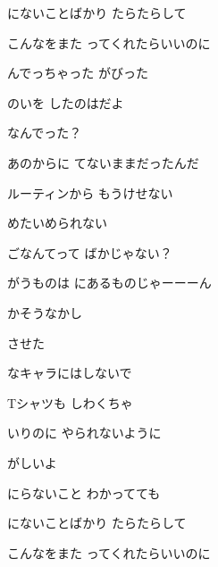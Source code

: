 \documentclass[a4paper,tate,twocolumn,12pt]{ltjtarticle}
\begin{document}
\begin{flushleft}
\begin{minipage}{\linewidth}
にないことばかり たらたらして

こんなをまた ってくれたらいいのに
\end{minipage}

\vspace{2em}

\noindent\begin{minipage}{\linewidth}
んでっちゃった がびった

のいを したのはだよ

なんでった？

あのからに てないままだったんだ
\end{minipage}

\vspace{2em}

\noindent\begin{minipage}{\linewidth}
ルーティンから もうけせない

めたいめられない 

ごなんてって ばかじゃない？

がうものは にあるものじゃーーーん
\end{minipage}

\vspace{2em}

\noindent\begin{minipage}{\linewidth}
かそうなかし

させた

なキャラにはしないで

Tシャツも しわくちゃ

いりのに やられないように

がしいよ 

にらないこと わかってても

にないことばかり たらたらして

こんなをまた ってくれたらいいのに
\end{minipage}


\end{flushleft}
\end{document}

